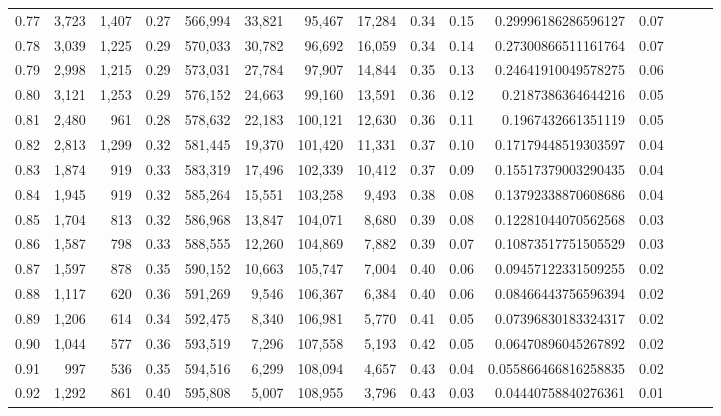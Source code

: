 \begin{tabular}{rrrrrrrrrrrrrrr}
0.77 &   3,723 &  1,407 &  0.27 &  566,994 &   33,821 &   95,467 &   17,284 &  0.34 &  0.15 &   0.29996186286596127 &      0.07 \\
0.78 &   3,039 &  1,225 &  0.29 &  570,033 &   30,782 &   96,692 &   16,059 &  0.34 &  0.14 &   0.27300866511161764 &      0.07 \\
0.79 &   2,998 &  1,215 &  0.29 &  573,031 &   27,784 &   97,907 &   14,844 &  0.35 &  0.13 &   0.24641910049578275 &      0.06 \\
0.80 &   3,121 &  1,253 &  0.29 &  576,152 &   24,663 &   99,160 &   13,591 &  0.36 &  0.12 &    0.2187386364644216 &      0.05 \\
0.81 &   2,480 &    961 &  0.28 &  578,632 &   22,183 &  100,121 &   12,630 &  0.36 &  0.11 &    0.1967432661351119 &      0.05 \\
0.82 &   2,813 &  1,299 &  0.32 &  581,445 &   19,370 &  101,420 &   11,331 &  0.37 &  0.10 &   0.17179448519303597 &      0.04 \\
0.83 &   1,874 &    919 &  0.33 &  583,319 &   17,496 &  102,339 &   10,412 &  0.37 &  0.09 &   0.15517379003290435 &      0.04 \\
0.84 &   1,945 &    919 &  0.32 &  585,264 &   15,551 &  103,258 &    9,493 &  0.38 &  0.08 &   0.13792338870608686 &      0.04 \\
0.85 &   1,704 &    813 &  0.32 &  586,968 &   13,847 &  104,071 &    8,680 &  0.39 &  0.08 &   0.12281044070562568 &      0.03 \\
0.86 &   1,587 &    798 &  0.33 &  588,555 &   12,260 &  104,869 &    7,882 &  0.39 &  0.07 &   0.10873517751505529 &      0.03 \\
0.87 &   1,597 &    878 &  0.35 &  590,152 &   10,663 &  105,747 &    7,004 &  0.40 &  0.06 &   0.09457122331509255 &      0.02 \\
0.88 &   1,117 &    620 &  0.36 &  591,269 &    9,546 &  106,367 &    6,384 &  0.40 &  0.06 &   0.08466443756596394 &      0.02 \\
0.89 &   1,206 &    614 &  0.34 &  592,475 &    8,340 &  106,981 &    5,770 &  0.41 &  0.05 &   0.07396830183324317 &      0.02 \\
0.90 &   1,044 &    577 &  0.36 &  593,519 &    7,296 &  107,558 &    5,193 &  0.42 &  0.05 &   0.06470896045267892 &      0.02 \\
0.91 &     997 &    536 &  0.35 &  594,516 &    6,299 &  108,094 &    4,657 &  0.43 &  0.04 &  0.055866466816258835 &      0.02 \\
0.92 &   1,292 &    861 &  0.40 &  595,808 &    5,007 &  108,955 &    3,796 &  0.43 &  0.03 &   0.04440758840276361 &      0.01 \\

\end{tabular}
